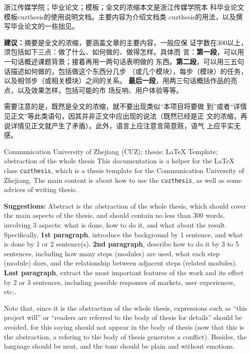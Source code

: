 \begin{chineseabstract}
	{浙江传媒学院；毕业论文；模板；全文的浓缩}本文是浙江传媒学院本
	科毕业论文模板cuzthesis的使用说明文档。主要内容为介绍文档类
	cuzthesis的用法，以及撰写毕业论文的一些拙见。

	\begin{leftbar}
		\noindent\textbf{建议：}摘要是全文的浓缩，要涵盖文章的主要内容，一般应保
		证字数在300以上，须包括如下三点：做了什么、如何做的、做得怎样。具体而
		言：\textbf{第一段}，可以用一句话概述课题背景；接着再用一两句话表明做的
		东西。\textbf{第二段}，可以用三五句话描述如何做的，包括做这个东西分几步
		（或几个模块），每步（模块）的任务，以及相邻步（或相关模块）之间的关系。
		\textbf{最后一段}，用两三句话概括作品的亮点，以及效果怎样，包括可能的市
		场反响、用户体验等等。

		\noindent{}需要注意的是，既然是全文的浓缩，就不要出现类似“本项目将要做
		到”或者“详情见正文”等此类语句，因其并非正文中应出现的说法（既然已经是正
		文的浓缩，再说详情见正文就产生了矛盾）。此外，语言上应注意言简意赅，语气
		上应平实无感。
	\end{leftbar}
\end{chineseabstract}
\begin{englishabstract}
	{Communication University of Zhejiang (CUZ); thesis; \LaTeX{} Template;
		abstraction of the whole thesis} This documentation is a helper for the
	\LaTeX{} class \texttt{cuzthesis}, which is a thesis template for the
	Communication University of Zhejiang. The main content is about how to
	use the \texttt{cuzthesis}, as well as some advices of writing thesis.

	\begin{leftbar}
		\noindent\textbf{Suggestions:} Abstract is the abstraction of the whole
		thesis, which should cover the main aspects of the thesis, and should
		contain no less than 300 words, involving 3 aspects: what is done, how
		to do it, and what about the result. Specifically, \textbf{1st
			paragraph}, introduce the background by 1 sentence, and what is done by
		1 or 2 sentence(s). \textbf{2nd paragraph}, describe how to do it by 3
		to 5 sentences, including how many steps (modules) are used, what each
		step (module) does, and the relationship between adjacent steps (related
		modules). \textbf{Last paragraph}, extract the most important features
		of the work and its effect by 2 or 3 sentences, including possible
		responses of markets, user experiences, etc..

		\noindent Note that, since it is the abstraction of the whole thesis,
		expressions such as ``this project will'' or ``readers are referred to
		the body of thesis for details'' should be avoided, for this saying
		should not appear in the body of thesis (now that this is the
		abstraction, a refering to the body of thesis generates a conflict).
		Besides, the language should be neat, and the tone should be plain and
		without emotions.
	\end{leftbar}
\end{englishabstract}